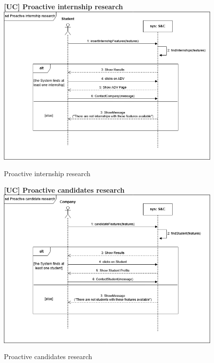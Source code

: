 \begin{figure}[H]
\textbf{[UC\nextUCDiagr] Proactive internship research}\newline\newline
\includegraphics[width=15cm]{Images/UC_diagram/RASD-UC11.drawio.png}
    \caption{Proactive internship research}
\end{figure}

\begin{figure}[H]
\textbf{[UC\nextUCDiagr] Proactive candidates research}\newline\newline
\includegraphics[width=15cm]{Images/UC_diagram/RASD-UC12.drawio.png}
    \caption{Proactive candidates research}
\end{figure}

